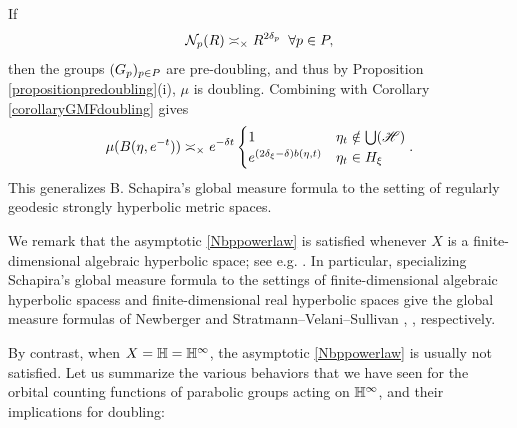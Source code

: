\begin{example}
\label{exampledoubling}
If
\begin{equation}
\label{Nbppowerlaw}
\mathcal N_p(R) \asymp_\times R^{2\delta_p} \;\;\forall p\in P,
\end{equation}
then the groups $(G_p)_{p\in P}$ are pre-doubling, and thus by Proposition \ref{propositionpredoubling}(i), $\mu$ is doubling. Combining with Corollary \ref{corollaryGMFdoubling} gives
\[
\mu(B(\eta,e^{-t})) \asymp_\times e^{-\delta t} \begin{cases}
1 & \eta_t\notin \bigcup(\mathscr H)\\
e^{(2\delta_\xi - \delta) b(\eta,t)} & \eta_t\in H_\xi
\end{cases}.
\]
This generalizes B. Schapira's global measure formula \cite[Th\'eor\`eme 3.2]{Schapira} to the setting of regularly geodesic strongly hyperbolic metric spaces.
\end{example}

We remark that the asymptotic \eqref{Nbppowerlaw} is satisfied whenever $X$ is a finite-dimensional algebraic hyperbolic space; see e.g. \cite[Lemma 3.5]{Newberger}. In particular, specializing Schapira's global measure formula to the settings of finite-dimensional algebraic hyperbolic spacess and finite-dimensional real hyperbolic spaces give the global measure formulas of Newberger \cite[Main Theorem]{Newberger} and Stratmann--Velani--Sullivan \cite[Theorem 2]{StratmannVelani}, \cite[Theorem on p.271]{Sullivan_entropy}, respectively.

By contrast, when $X = \H = \H^\infty$, the asymptotic \eqref{Nbppowerlaw} is usually not satisfied. Let us summarize the various behaviors that we have seen for the orbital counting functions of parabolic groups acting on $\H^\infty$, and their implications for doubling:

